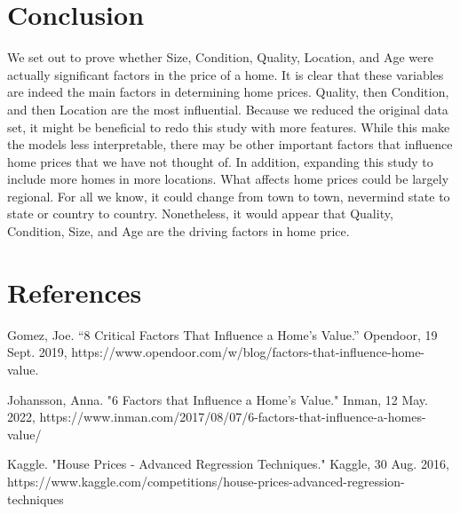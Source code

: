 \documentclass{article}
\begin{document}
	
	\section{Conclusion}

	We set out to prove whether Size, Condition, Quality, Location, and Age were actually significant factors in the price of a home. It is clear that these variables are indeed the main factors in determining home prices. Quality, then Condition, and then Location are the most influential. Because we reduced the original data set, it might be beneficial to redo this study with more features. While this make the models less interpretable, there may be other important factors that influence home prices that we have not thought of. In addition, expanding this study to include more homes in more locations. What affects home prices could be largely regional. For all we know, it could change from town to town, nevermind state to state or country to country. Nonetheless, it would appear that Quality, Condition, Size, and Age are the driving factors in home price. 
	
	
	\section{References}
	
	Gomez, Joe. “8 Critical Factors That Influence a Home's Value.” Opendoor, 19 Sept. 2019, https://www.opendoor.com/w/blog/factors-that-influence-home-value. 
	
	Johansson, Anna. "6 Factors that Influence a Home's Value." Inman, 12 May. 2022, https://www.inman.com/2017/08/07/6-factors-that-influence-a-homes-value/
	
	Kaggle. "House Prices - Advanced Regression Techniques." Kaggle, 30 Aug. 2016, https://www.kaggle.com/competitions/house-prices-advanced-regression-techniques
	
\end{document}
